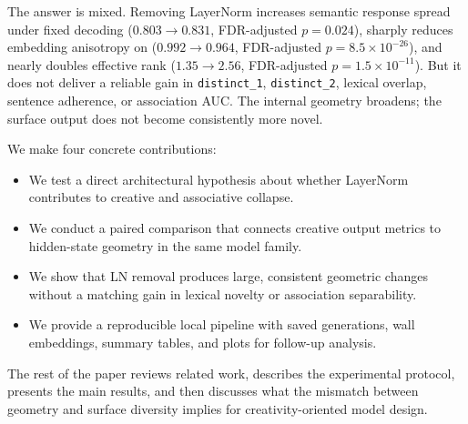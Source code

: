  The answer is mixed. Removing LayerNorm increases semantic response spread under fixed decoding ($0.803 \rightarrow 0.831$, FDR-adjusted $p=0.024$), sharply reduces embedding anisotropy on \ocw ($0.992 \rightarrow 0.964$, FDR-adjusted $p=8.5\times10^{-26}$), and nearly doubles effective rank ($1.35 \rightarrow 2.56$, FDR-adjusted $p=1.5\times10^{-11}$). But it does not deliver a reliable gain in \texttt{distinct\_1}, \texttt{distinct\_2}, lexical overlap, sentence adherence, or association AUC. The internal geometry broadens; the surface output does not become consistently more novel.

 We make four concrete contributions:
\begin{itemize}[leftmargin=*,itemsep=0pt,topsep=0pt]
    \item We test a direct architectural hypothesis about whether LayerNorm contributes to creative and associative collapse.
    \item We conduct a paired comparison that connects creative output metrics to hidden-state geometry in the same model family.
    \item We show that LN removal produces large, consistent geometric changes without a matching gain in lexical novelty or association separability.
    \item We provide a reproducible local pipeline with saved generations, wall embeddings, summary tables, and plots for follow-up analysis.
\end{itemize}

The rest of the paper reviews related work, describes the experimental protocol, presents the main results, and then discusses what the mismatch between geometry and surface diversity implies for creativity-oriented model design.
